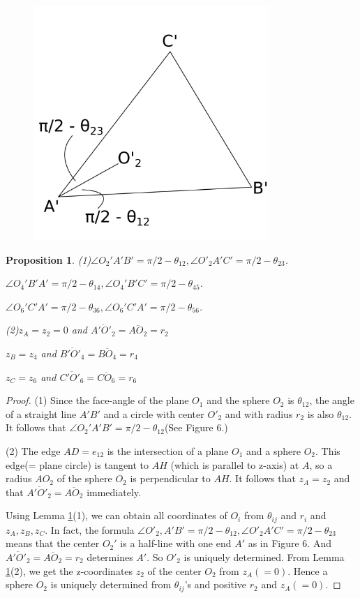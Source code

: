 \documentclass[dvipdfmx]{interact}
\theoremstyle{plain}%
\newtheorem{proposition}[theorem]{Proposition}
\theoremstyle{definition}
\theoremstyle{remark}
\theoremstyle{problemstyle}
\begin{document}
\begin{figure}[h!tbp]
 \centering
 \includegraphics[width=3.5in, height=3.5in,
 keepaspectratio]{./img/HexahedraWithSphericalFaces/abcTriangle.png}
 \caption{}
 \label{fig:sideSlice}
\end{figure}

\begin{proposition}\label{angles}
 (1)$\angle O_2'A'B' = \pi/2 - \theta_{12}, \angle
 O'_2A'C'=\pi/2-\theta_{23}$.

  $\angle O_4'B'A' = \pi/2 - \theta_{14}, \angle O_4'B'C' = \pi/2 -
 \theta_{45}$.

 $\angle O_6'C'A' = \pi/2 - \theta_{36}, \angle O_6'C'A' = \pi/2 - \theta_{56}$.

 (2)$z_A = z_2 = 0$ and $\overline{A'O'_2} = \overline{AO_2} = r_2$

 $z_B = z_4$ and $\overline{B'O'_4} = \overline{BO_4} = r_4$

 $z_C = z_6$ and $\overline{C'O'_6} = \overline{CO_6} = r_6$
\end{proposition}

\begin{proof}
 (1) Since the face-angle of the plane $O_1$ and the sphere $O_2$ is
 $\theta_{12}$, the angle of a straight line $A'B'$ and a circle with
 center $O'_2$ and with radius $r_2$ is also $\theta_{12}$. It follows
 that $\angle O_2'A'B' = \pi/2 - \theta_{12}$(See Figure 6.)
 
 (2) The edge $AD = e_{12}$ is the intersection of a plane $O_1$ and a
 sphere $O_2$. This edge(= plane circle) is tangent to $AH$ (which is
 parallel to z-axis) at $A$, so a radius $AO_2$ of the sphere $O_2$ is
 perpendicular to $AH$. It follows that $z_A=z_2$ and that
 $\overline{A'O'_2} = \overline{AO_2}$ immediately.

 Using Lemma \ref{angles}(1), we can obtain all coordinates of $O_i$ from
 $\theta_{ij}$ and $r_i$ and $z_A, z_B, z_C$. In fact, the formula
 $\angle O'_2, A'B' = \pi/2 - \theta_{12}, \angle O'_{2}A'C' = \pi/2 -
 \theta_{23}$ means that the center $O_2'$ is a half-line with one
 end $A'$ as in Figure 6.
 And $\overline{A'O'_2} = \overline{AO_2} = r_2$ determines $A'$.
 So $O'_2$ is uniquely determined. From Lemma \ref{angles}(2), we get the
 z-coordinates $z_2$ of the center $O_2$ from $z_A(=0)$. Hence a sphere
 $O_2$ is uniquely determined from $\theta_{ij}$'s and positive $r_2$
 and $z_A(= 0)$.
\end{proof}
\end{document}
